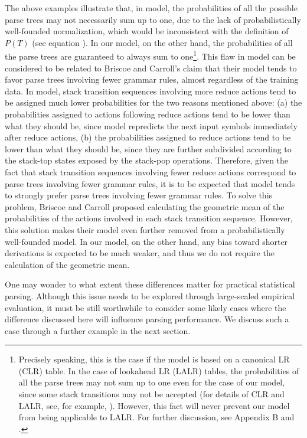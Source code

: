 \documentclass[a4j]{article}
\def\BC{}
\def\eq#1{}
\begin{document}
The above examples illustrate that, in \BC model, the probabilities of
all the possible parse trees may not necessarily sum up to one, due to
the lack of probabilistically well-founded normalization, which would be
inconsistent with the definition of $P(T)$ (see equation \eq{Tset0}). In
our model, on the other hand, the probabilities of all the parse trees
are guaranteed to always sum to one\footnote{Precisely speaking, this is
the case if the model is based on a canonical LR (CLR) table. In the
case of lookahead LR (LALR) tables, the probabilities of all the parse
trees may not sum up to one even for the case of our model, since some
stack transitions may not be accepted (for details of CLR and LALR, see,
for example, \cite{aho:86:a,chapman:87:a}). However, this fact will
never prevent our model from being applicable to LALR. For further
discussion, see Appendix B and \cite{inui:97:a}.}. This flaw in \BC
model can be considered to be related to Briscoe and Carroll's claim
that their model tends to favor parse trees involving fewer grammar
rules, almost regardless of the training data. In \BC model, stack
transition sequences involving more reduce actions tend to be assigned
much lower probabilities for the two reasons mentioned above: (a) the
probabilities assigned to actions following reduce actions tend to be
lower than what they should be, since \BC model repredicts the next
input symbols immediately after reduce actions, (b) the probabilities
assigned to reduce actions tend to be lower than what they should be,
since they are further subdivided according to the stack-top states
exposed by the stack-pop operations. Therefore, given the fact that
stack transition sequences involving fewer reduce actions correspond to
parse trees involving fewer grammar rules, it is to be expected that \BC
model tends to strongly prefer parse trees involving fewer grammar
rules. To solve this problem, Briscoe and Carroll proposed calculating
the geometric mean of the probabilities of the actions involved in each
stack transition sequence. However, this solution makes their model even
further removed from a probabilistically well-founded model. In our
model, on the other hand, any bias toward shorter derivations is
expected to be much weaker, and thus we do not require the calculation
of the geometric mean.

One may wonder to what extent these differences matter for practical
statistical parsing. Although this issue needs to be explored through
large-scaled empirical evaluation, it must be still worthwhile to
consider some likely cases where the difference discussed here will
influence parsing performance. We discuss such a case through a further
example in the next section.
\end{document}
